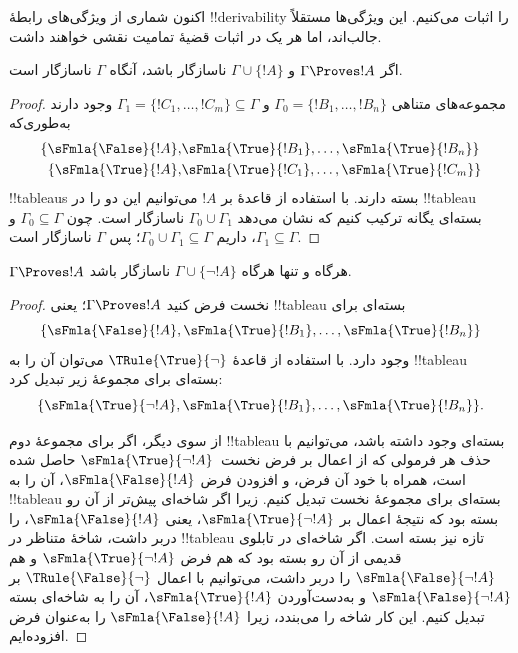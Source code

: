 \documentclass[../../../include/open-logic-section]{subfiles}
\begin{document}
      {}
      {}


اکنون شماری از ویژگی‌های رابطهٔ !!{derivability} را اثبات می‌کنیم. این
ویژگی‌ها مستقلاً جالب‌اند، اما هر یک در اثبات قضیهٔ تمامیت نقشی خواهند
داشت.

\begin{prop}
  اگر $\Gamma \Proves !A$ و $\Gamma \cup \{!A\}$ ناسازگار باشد، آنگاه
  $\Gamma$ ناسازگار است.
\end{prop}

\begin{proof}
مجموعه‌های متناهی $\Gamma_0 = \{!B_1, \dots, !B_n\}$ و $\Gamma_1
  =\{!C_1, \dots, !C_m\} \subseteq \Gamma$ وجود دارند به‌طوری‌که
  \begin{align*}
    \{\sFmla{\False}{!A}, &
    \sFmla{\True}{!B_1}, \dots, \sFmla{\True}{!B_n}\} \\
    \{\sFmla{\True}{!A}, &
    \sFmla{\True}{!C_1}, \dots, \sFmla{\True}{!C_m}\}
  \end{align*}
  !!{tableau}s بسته دارند. با استفاده از قاعدهٔ \Cut{} بر $!A$ می‌توانیم
  این دو را در !!{tableau} بسته‌ای یگانه ترکیب کنیم که نشان می‌دهد
  $\Gamma_0 \cup \Gamma_1$ ناسازگار است. چون $\Gamma_0
  \subseteq \Gamma$ و $\Gamma_1 \subseteq \Gamma$، داریم $\Gamma_0 \cup
  \Gamma_1 \subseteq \Gamma$؛ پس $\Gamma$ ناسازگار است.
\end{proof}

\begin{prop}
$\Gamma \Proves !A$ هرگاه و تنها هرگاه $\Gamma \cup \{\lnot !A\}$
ناسازگار باشد.
\end{prop}

\begin{proof}
نخست فرض کنید $\Gamma \Proves !A$؛ یعنی !!{tableau} بسته‌ای برای
\[
\{\sFmla{\False}{!A},
\sFmla{\True}{!B_1}, \dots, \sFmla{\True}{!B_n}\}
\]
وجود دارد. با استفاده از قاعدهٔ $\TRule{\True}{\lnot}$ می‌توان آن را به
!!{tableau} بسته‌ای برای مجموعهٔ زیر تبدیل کرد:
\[
\{\sFmla{\True}{\lnot !A},
\sFmla{\True}{!B_1}, \dots, \sFmla{\True}{!B_n}\}.
\]

از سوی دیگر، اگر برای مجموعهٔ دوم !!{tableau} بسته‌ای وجود داشته باشد،
می‌توانیم با حذف هر فرمولی که از اعمال \TRule{\True}{\lnot} بر فرض
نخست~$\sFmla{\True}{\lnot !A}$ حاصل شده است، همراه با خود آن فرض، و
افزودن فرض $\sFmla{\False}{!A}$، آن را به !!{tableau} بسته‌ای برای
مجموعهٔ نخست تبدیل کنیم. زیرا اگر شاخه‌ای پیش‌تر از آن رو بسته بود که
نتیجهٔ اعمال \TRule{\True}{\lnot} بر
$\sFmla{\True}{\lnot !A}$، یعنی $\sFmla{\False}{!A}$، را دربر داشت، شاخهٔ
متناظر در !!{tableau} تازه نیز بسته است. اگر شاخه‌ای در تابلوی قدیمی از
آن رو بسته بود که هم فرض $\sFmla{\True}{\lnot !A}$ و هم
$\sFmla{\False}{\lnot !A}$ را دربر داشت، می‌توانیم با اعمال
$\TRule{\False}{\lnot}$ بر $\sFmla{\False}{\lnot !A}$ و به‌دست‌آوردن
$\sFmla{\True}{!A}$، آن را به شاخه‌ای بسته تبدیل کنیم. این کار شاخه را
می‌بندد، زیرا $\sFmla{\False}{!A}$ را به‌عنوان فرض افزوده‌ایم.
\end{proof}
\end{document}
